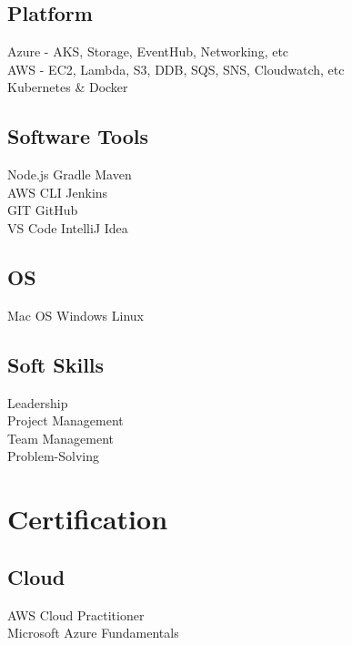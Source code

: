 \documentclass[]{main}
\begin{document}
\begin{minipage}[t]{0.25\textwidth}
\subsection{Platform}\sectionsep
\textbullet{}  Azure - AKS, Storage, EventHub, Networking, etc\\
\textbullet{}  AWS - EC2, Lambda, S3, DDB, SQS, SNS, Cloudwatch, etc\\
\textbullet{}  Kubernetes \& Docker
\sectionsep

\subsection{Software Tools}\sectionsep
\textbullet{} Node.js \textbullet{} Gradle \textbullet{} Maven\\
\textbullet{} AWS CLI \textbullet{} Jenkins\\
\textbullet{} GIT  \textbullet{} GitHub\\ 
\textbullet{} VS Code \textbullet{} IntelliJ Idea 
\sectionsep

\subsection{OS}\sectionsep
\textbullet{} Mac OS \textbullet{} Windows \textbullet{} Linux  
\sectionsep

\subsection{Soft Skills}\sectionsep
Leadership\\
Project Management\\
Team Management\\
Problem-Solving
\sectionsep

\section{Certification}
\subsection{Cloud}
\sectionsep
AWS Cloud Practitioner\\
Microsoft Azure Fundamentals\\


\end{minipage}
\end{document}
